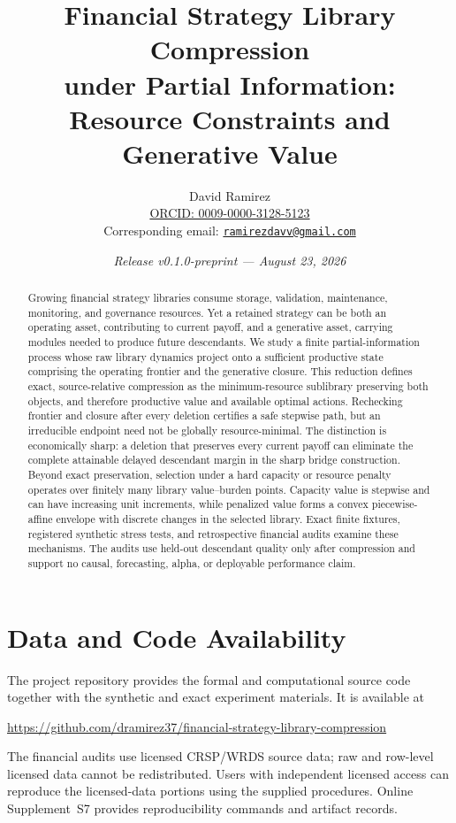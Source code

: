 \documentclass[11pt]{article}
\title{Financial Strategy Library Compression\\
under Partial Information:\\
Resource Constraints and Generative Value}
\author{David Ramirez\\
\href{https://orcid.org/0009-0000-3128-5123}{ORCID: 0009-0000-3128-5123}\\
Corresponding email: \href{mailto:ramirezdavv@gmail.com}{\texttt{ramirezdavv@gmail.com}}}
\date{\textit{Release v0.1.0-preprint --- August 23, 2026}}
\numberwithin{equation}{section}
\theoremstyle{definition}
\theoremstyle{plain}
\begin{document}
\maketitle

\begin{abstract}
Growing financial strategy libraries consume storage, validation, maintenance,
monitoring, and governance resources. Yet a retained strategy can be both an
operating asset, contributing to current payoff, and a generative asset,
carrying modules needed to produce future descendants. We study a finite
partial-information process whose raw library dynamics project onto a
sufficient productive state comprising the operating frontier and the
generative closure. This reduction defines exact, source-relative compression
as the
minimum-resource sublibrary preserving both objects, and therefore productive
value and available optimal actions. Rechecking frontier and closure after
every deletion certifies a safe stepwise path, but an irreducible endpoint need
not be globally resource-minimal. The distinction is economically sharp: a
deletion that preserves every current payoff can eliminate the complete
attainable delayed descendant margin in the sharp bridge construction. Beyond
exact preservation, selection under a hard capacity or resource penalty
operates over finitely many library value--burden points. Capacity value is
stepwise and
can have increasing unit increments, while penalized value forms a convex
piecewise-affine envelope with discrete changes in the selected library. Exact
finite fixtures, registered synthetic stress tests, and retrospective
financial audits examine these mechanisms. The audits use held-out descendant
quality only after compression and support no causal, forecasting, alpha, or
deployable performance claim.
\end{abstract}













\section*{Data and Code Availability}
The project repository provides the formal and computational source code
together with the synthetic and exact experiment materials.  It is available
at
\begin{center}
\url{https://github.com/dramirez37/financial-strategy-library-compression}
\end{center}
The financial audits use licensed CRSP/WRDS source data; raw and row-level
licensed data cannot be redistributed.  Users with independent licensed access
can reproduce the licensed-data portions using the supplied procedures.
Online Supplement~S7 provides reproducibility commands and artifact records.
\end{document}
